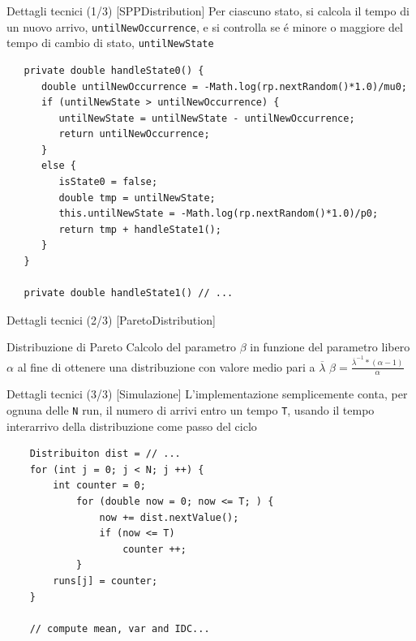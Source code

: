 \documentclass[slidestop,compress,mathserif]{beamer}
\begin{document}
\begin{frame}[containsverbatim]{Dettagli tecnici (1/3) [SPPDistribution]}
\vfill
Per ciascuno stato, si calcola il tempo di un nuovo arrivo, \texttt{untilNewOccurrence}, e si controlla se \'e minore o maggiore del tempo di cambio di stato, \texttt{untilNewState}
\scriptsize
\begin{verbatim}
   private double handleState0() {
      double untilNewOccurrence = -Math.log(rp.nextRandom()*1.0)/mu0;
      if (untilNewState > untilNewOccurrence) {
         untilNewState = untilNewState - untilNewOccurrence;
         return untilNewOccurrence;
      }
      else {
         isState0 = false;
         double tmp = untilNewState;
         this.untilNewState = -Math.log(rp.nextRandom()*1.0)/p0;
         return tmp + handleState1();
      }
   }
   	
   private double handleState1() // ...
\end{verbatim}
\normalsize
\vfill
\end{frame}

\begin{frame}[containsverbatim]{Dettagli tecnici (2/3) [ParetoDistribution]}
\vfill
\begin{block}{Distribuzione di Pareto}
Calcolo del parametro $\beta$ in funzione del parametro libero $\alpha$ al fine di ottenere una distribuzione con valore medio pari a $\overline{\lambda}$
\Large
$\beta = \frac{\overline{\lambda}^{-1} * (\alpha - 1)}{\alpha}$%
\normalsize
\end{block}
\vfill
\end{frame}

\begin{frame}[containsverbatim]{Dettagli tecnici (3/3) [Simulazione]}
\vfill
L'implementazione semplicemente conta, per ognuna delle \texttt{N} run, il numero di arrivi entro un tempo \texttt{T}, usando il tempo interarrivo della distribuzione come passo del ciclo
\scriptsize
\begin{verbatim}
    Distribuiton dist = // ...
    for (int j = 0; j < N; j ++) {
        int counter = 0;
            for (double now = 0; now <= T; ) {
                now += dist.nextValue();
                if (now <= T)
                    counter ++;
            }
        runs[j] = counter;
    }

    // compute mean, var and IDC... 
		
\end{verbatim}
\normalsize
\vfill
\end{frame}
\end{document}
